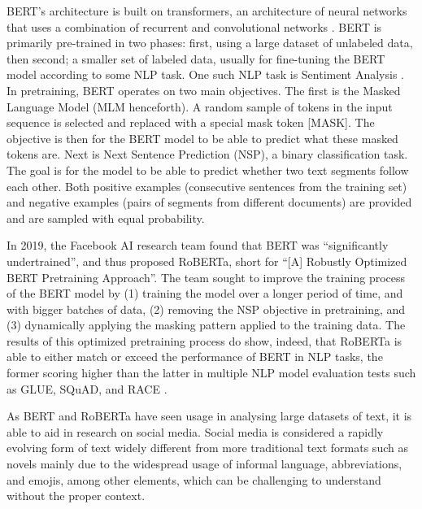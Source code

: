 BERT’s architecture is built on transformers, an architecture of neural networks that uses a combination of recurrent and convolutional networks \cite{Koroteev-2021}. BERT is primarily pre-trained in two phases: first, using a large dataset of unlabeled data, then second; a smaller set of labeled data, usually for fine-tuning the BERT model according to some NLP task. One such NLP task is Sentiment Analysis \cite{Koroteev-2021}. In pretraining, BERT operates on two main objectives. The first is the Masked Language Model (MLM henceforth). A random sample of tokens in the input sequence is selected and replaced with a special mask token [MASK]. The objective is then for the BERT model to be able to predict what these masked tokens are. Next is Next Sentence Prediction (NSP), a binary classification task. The goal is for the model to be able to predict whether two text segments follow each other. Both positive examples (consecutive sentences from the training set) and negative examples (pairs of segments from different documents) are provided and are sampled with equal probability.

In 2019, the Facebook AI research team found that BERT was “significantly undertrained”, and thus proposed RoBERTa, short for “[A] Robustly Optimized BERT Pretraining Approach”. The team sought to improve the training process of the BERT model by (1) training the model over a longer period of time, and with bigger batches of data, (2) removing the NSP objective in pretraining, and (3) dynamically applying the masking pattern applied to the training data. The results of this optimized pretraining process do show, indeed, that RoBERTa is able to either match or exceed the performance of BERT in NLP tasks, the former scoring higher than the latter in multiple NLP model evaluation tests such as GLUE, SQuAD, and RACE \cite{Liu-2019}.

As BERT and RoBERTa have seen usage in analysing large datasets of text, it is able to aid in research on social media. Social media is considered a rapidly evolving form of text widely different from more traditional text formats such as novels mainly due to the widespread usage of informal language, abbreviations, and emojis, among other elements, which can be challenging to understand without the proper context.

